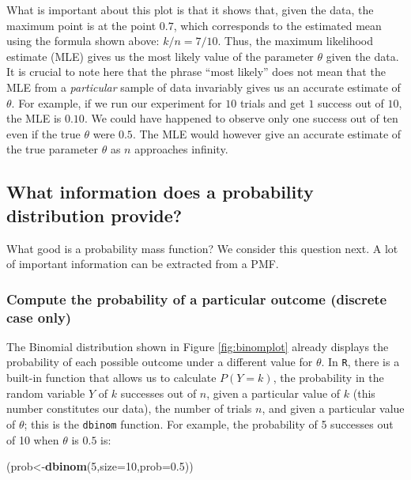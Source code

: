 \documentclass[12pt,]{krantz}
\newenvironment{Shaded}{\begin{snugshade}}{\end{snugshade}}
\newcommand{\DataTypeTok}[1]{\textcolor[rgb]{0.13,0.29,0.53}{#1}}
\newcommand{\DecValTok}[1]{\textcolor[rgb]{0.00,0.00,0.81}{#1}}
\newcommand{\FloatTok}[1]{\textcolor[rgb]{0.00,0.00,0.81}{#1}}
\newcommand{\KeywordTok}[1]{\textcolor[rgb]{0.13,0.29,0.53}{\textbf{#1}}}
\newcommand{\NormalTok}[1]{#1}
\begin{document}
What is important about this plot is that it shows that, given the data, the maximum point is at the point \(0.7\), which corresponds to the estimated mean using the formula shown above: \(k/n = 7/10\). Thus, the maximum likelihood estimate (MLE) gives us the most likely value of the parameter \(\theta\) given the data. It is crucial to note here that the phrase ``most likely'' does not mean that the MLE from a \emph{particular} sample of data invariably gives us an accurate estimate of \(\theta\). For example, if we run our experiment for \(10\) trials and get \(1\) success out of \(10\), the MLE is \(0.10\). We could have happened to observe only one success out of ten even if the true \(\theta\) were \(0.5\). The MLE would however give an accurate estimate of the true parameter \(\theta\) as \(n\) approaches infinity.

\hypertarget{what-information-does-a-probability-distribution-provide}{%
\subsection{What information does a probability distribution provide?}\label{what-information-does-a-probability-distribution-provide}}

What good is a probability mass function? We consider this question next. A lot of important information can be extracted from a PMF.

\hypertarget{compute-the-probability-of-a-particular-outcome-discrete-case-only}{%
\subsubsection{Compute the probability of a particular outcome (discrete case only)}\label{compute-the-probability-of-a-particular-outcome-discrete-case-only}}

The Binomial distribution shown in Figure \ref{fig:binomplot} already displays the probability of each possible outcome under a different value for \(\theta\). In \texttt{R}, there is a built-in function that allows us to calculate \(P(Y=k)\), the probability in the random variable \(Y\) of \(k\) successes out of \(n\), given a particular value of \(k\) (this number constitutes our data), the number of trials \(n\), and given a particular value of \(\theta\); this is the \texttt{dbinom} function. For example, the probability of 5 successes out of 10 when \(\theta\) is \(0.5\) is:

\begin{Shaded}
\begin{Highlighting}[]
\NormalTok{(prob<-}\KeywordTok{dbinom}\NormalTok{(}\DecValTok{5}\NormalTok{,}\DataTypeTok{size=}\DecValTok{10}\NormalTok{,}\DataTypeTok{prob=}\FloatTok{0.5}\NormalTok{))}
\end{Highlighting}
\end{Shaded}
\end{document}
